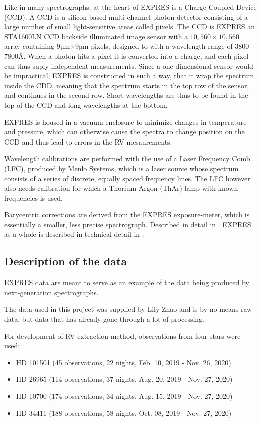 Like in many spectrographs, at the heart of EXPRES is a Charge Coupled Device (CCD). A CCD is a silicon-based multi-channel photon detector consisting of a large number of small light-sensitive areas called pixels. The CCD is EXPRES an STA1600LN CCD backside illuminated image sensor with a $10,560 \times 10,560$ array containing 9µm$\times$9µm pixels, designed to with a wavelength range of 3800$-$7800Å. When a photon hits a pixel it is converted into a charge, and each pixel can thus suply independent measurements. Since a one dimensional sensor would be impractical, EXPRES is constructed in such a way, that it wrap the spectrum inside the CDD, meaning that the spectrum starts in the top row of the sensor, and continues in the second row. Short wavelengths are thus to be found in the top of the CCD and long wavelengths at the bottom. 


EXPRES is housed in a vacuum enclosure to minimize changes in temperature and pressure, which can otherwise cause the spectra to change position on the CCD and thus lead to errors in the RV mesaurements. 

Wavelength calibrations are performed with the use of a Laser Frequency Comb 
(LFC), produced by Menlo Systems, which is a laser source whose spectrum consists of a series of discrete, equally spaced frequency lines. The LFC however also needs calibration for which a Thorium Argon (ThAr) lamp with known frequencies is used.

Barycentric corrections are derived from the EXPRES exposure-meter, which is essentially a smaller, less precise spectrograph. Described in detail in \cite{barycentric_exposure_meter_blackman}. EXPRES as a whole is described in technical detail in \cite{EXPRES_technical_details_Jurgenson}.


\subsection{Description of the data}
EXPRES data are meant to serve as an example of the data being produced by next-generation spectrographs. 

The data used in this project was supplied by Lily Zhao and is by no means raw data, but data that has already gone through a lot of processing.

For development of RV extraction method, observations from four stars were used: 

\begin{itemize}
    \item HD 101501 (45 observations, 22 nights, Feb. 10, 2019 - Nov. 26, 2020)
    \item HD 26965 (114 observations, 37 nights, Aug. 20, 2019 - Nov. 27, 2020)
    \item HD 10700 (174 observations, 34 nights, Aug. 15, 2019 - Nov. 27, 2020)
    \item HD 34411 (188 observations, 58 nights, Oct. 08, 2019 - Nov. 27, 2020)
\end{itemize}

